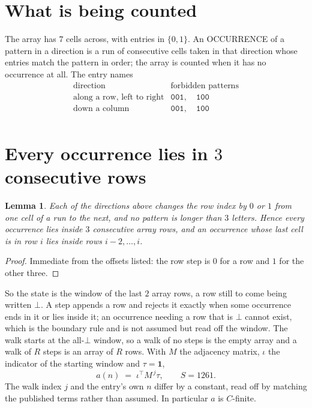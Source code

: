 \documentclass[11pt,a4paper]{article}
\theoremstyle{plain}
\newtheorem{lemma}[theorem]{Lemma}
\theoremstyle{definition}
\begin{document}
\section{What is being counted}

The array has $7$ cells across, with entries in $\{0,1\}$. An OCCURRENCE of a pattern in a
direction is a run of consecutive cells taken in that direction whose entries match the pattern
in order; the array is counted when it has no occurrence at all. The entry names
\[
\begin{array}{ll}
\text{direction} & \text{forbidden patterns} \\[2pt]
\text{along a row, left to right} & \mathtt{001},\quad \mathtt{100} \\
\text{down a column} & \mathtt{001},\quad \mathtt{100} \\
\end{array}
\]


\section{Every occurrence lies in $3$ consecutive rows}

\begin{lemma}\label{lem:win}
Each of the directions above changes the row index by $0$ or $1$ from one cell of a run to the
next, and no pattern is longer than $3$ letters. Hence every occurrence lies inside $3$
consecutive array rows, and an occurrence whose last cell is in row $i$ lies inside rows
$i-2,\dots,i$.
\end{lemma}

\begin{proof}
Immediate from the offsets listed: the row step is $0$ for a row and $1$ for the other three.
\end{proof}

So the state is the window of the last $2$ array rows, a row still to come being written
$\bot$. A step appends a row and rejects it exactly when some occurrence ends in it or lies
inside it; an occurrence needing a row that is $\bot$ cannot exist, which is the boundary rule
and is not assumed but read off the window. The walk starts at the all-$\bot$ window, so a walk
of no steps is the empty array and a walk of $R$ steps is an array of $R$ rows. With $M$ the
adjacency matrix, $\iota$ the indicator of the starting window and $\tau=\mathbf{1}$,
\[
a(n)\;=\;\iota^{\!\top}M^{\,j}\tau ,\qquad S=1261.
\]
The walk index $j$ and the entry's own $n$ differ by a constant, read off by matching the
published terms rather than assumed. In particular $a$ is $C$-finite.
\end{document}
